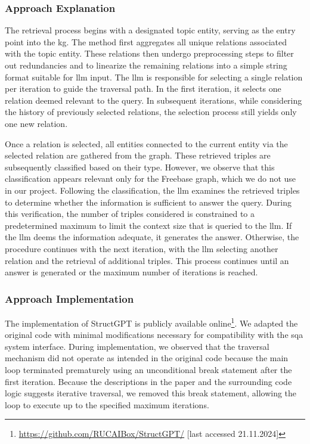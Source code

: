 \subsubsection{Approach Explanation} 
The retrieval process begins with a designated topic entity, serving as the entry point into the \gls{kg}. The method first aggregates all unique relations associated with the topic entity. These relations then undergo preprocessing steps to filter out redundancies and to linearize the remaining relations into a simple string format suitable for \gls{llm} input. The \gls{llm} is responsible for selecting a single relation per iteration to guide the traversal path. In the first iteration, it selects one relation deemed relevant to the query. In subsequent iterations, while considering the history of previously selected relations, the selection process still yields only one new relation.

Once a relation is selected, all entities connected to the current entity via the selected relation are gathered from the graph. These retrieved triples are subsequently classified based on their type. However, we observe that this classification appears relevant only for the Freebase graph, which we do not use in our project. Following the classification, the \gls{llm} examines the retrieved triples to determine whether the information is sufficient to answer the query. During this verification, the number of triples considered is constrained to a predetermined maximum to limit the context size that is queried to the \gls{llm}. If the \gls{llm} deems the information adequate, it generates the answer. Otherwise, the procedure continues with the next iteration, with the \gls{llm} selecting another relation and the retrieval of additional triples. This process continues until an answer is generated or the maximum number of iterations is reached.

\subsubsection{Approach Implementation} 
The implementation of StructGPT is publicly available online\footnote{\url{https://github.com/RUCAIBox/StructGPT/} [last accessed 21.11.2024]}. We adapted the original code with minimal modifications necessary for compatibility with the \gls{sqa} system interface. During implementation, we observed that the traversal mechanism did not operate as intended in the original code because the main loop terminated prematurely using an unconditional break statement after the first iteration. Because the descriptions in the paper and the surrounding code logic suggests iterative traversal, we removed this break statement, allowing the loop to execute up to the specified maximum iterations.

